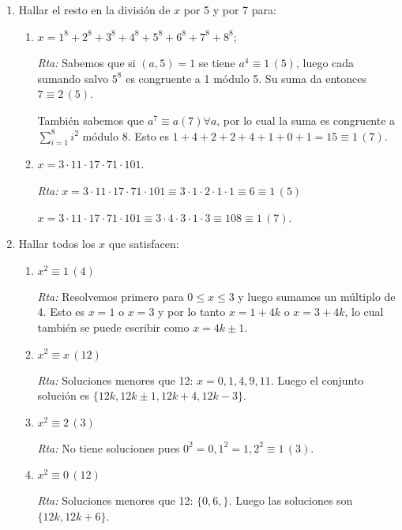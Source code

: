 \documentclass[12pt,spanish,makeidx]{amsbook}
\newcommand{\rta}{\noindent\textit{Rta: }}
\newcommand{\md}[1]{{\,}\left(#1\right)}
\begin{document}
\begin{enumerate}
	
	\smallskip
	\item Hallar el resto en la división de $x$ por 5 y por 7 para:
	\begin{enumerate}
		\item $x=1^8 + 2^8 + 3^8 + 4^8 + 5^8 + 6^8 + 7^8 + 8^8$;
			
		\rta Sabemos que si $(a,5)=1$ se tiene $a^4\equiv 1 \md{5}$, luego cada sumando salvo $5^8$ es congruente a 1 módulo 5. 
		Su suma da entonces $7\equiv 2 \md{5}$.
		
		También sabemos que $a^7\equiv a (7) \forall a$, por lo cual la suma es congruente a $\sum_{i=1}^8i^2$ módulo 8.
		Esto es $1+4+2+2+4+1+0+1=15\equiv 1 \md{7}$.
		
		\item $x=3\cdot 11\cdot 17\cdot 71\cdot 101$.
			
		\rta $ x = 3 \cdot11\cdot17 \cdot 71 \cdot101\equiv 3 \cdot1 \cdot2 \cdot1 \cdot1\equiv 6\equiv 1 \md{5}$
		
		$ x = 3\cdot11\cdot17 \cdot 71 \cdot101\equiv 3\cdot4\cdot3\cdot1\cdot3\equiv 108\equiv 1 \md{7}$.
		
		
	\end{enumerate}
	
	\smallskip

	
	
	\item Hallar todos los $x$ que satisfacen:
	\begin{enumerate}
		\item $x^2 \equiv1 \md{4}$\quad
		
		\rta Resolvemos primero para $0\le x\le3$ y luego sumamos un múltiplo de 4. Esto es $x= 1$ o $x=3$ y por lo tanto $x=1+4k$ o $x=3+4k$, lo cual también se puede escribir como $x=4k\pm 1$.
		
		\item$x^2  \equiv x\md{12}$ 
		
		\rta Soluciones menores que 12: $x=0, 1, 4, 9, 11.$ Luego el conjunto solución es $\{12k, 12k\pm1, 12k+4, 12k-3\}$.
		
		\item $x^2  \equiv 2\md{3}$\quad
		
	\rta 	No tiene soluciones pues $0^2=0, 1^2=1, 2^2\equiv 1 \md{3}$.
		
		\item $ x^2  \equiv 0\md{12}$
		
		\rta Soluciones menores que 12: $\{ 0, 6,\}$. Luego las soluciones son $\{12k, 12k+6\}$.
		

\end{enumerate}
\end{enumerate}
\end{document}
